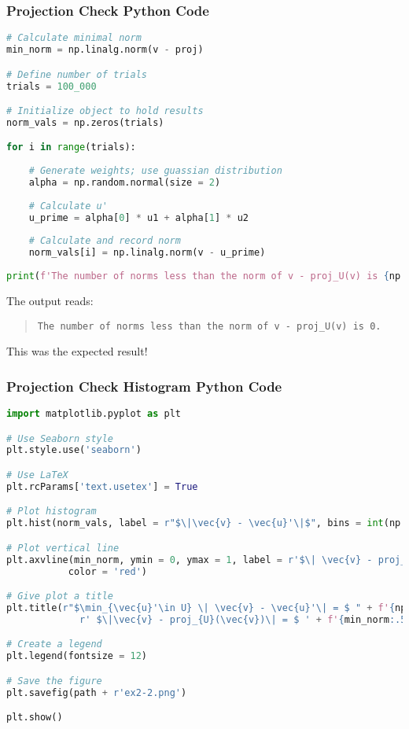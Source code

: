 \documentclass{beamer}
\begin{document}
\begin{frame}[fragile]
\frametitle{Projection Check Python Code}
\begin{lstlisting}[language=Python]
# Calculate minimal norm
min_norm = np.linalg.norm(v - proj)

# Define number of trials
trials = 100_000

# Initialize object to hold results
norm_vals = np.zeros(trials)

for i in range(trials):
    
    # Generate weights; use guassian distribution
    alpha = np.random.normal(size = 2)
    
    # Calculate u'
    u_prime = alpha[0] * u1 + alpha[1] * u2
    
    # Calculate and record norm
    norm_vals[i] = np.linalg.norm(v - u_prime)
    
print(f'The number of norms less than the norm of v - proj_U(v) is {np.sum(norm_vals < min_norm)}.')
\end{lstlisting}
The output reads:
\begin{quote}
\small
\texttt{The number of norms less than the norm of v - proj\_U(v) is 0.}
\end{quote}
This was the expected result!
\end{frame}

\begin{frame}[fragile]
\frametitle{Projection Check Histogram Python Code}

\begin{lstlisting}[language=Python]
import matplotlib.pyplot as plt

# Use Seaborn style
plt.style.use('seaborn')

# Use LaTeX
plt.rcParams['text.usetex'] = True

# Plot histogram
plt.hist(norm_vals, label = r"$\|\vec{v} - \vec{u}'\|$", bins = int(np.sqrt(trials)))

# Plot vertical line
plt.axvline(min_norm, ymin = 0, ymax = 1, label = r'$\| \vec{v} - proj_U(\vec{v})\|$', 
           color = 'red')

# Give plot a title
plt.title(r"$\min_{\vec{u}'\in U} \| \vec{v} - \vec{u}'\| = $ " + f'{np.min(norm_vals):.5f};' +
             r' $\|\vec{v} - proj_{U}(\vec{v})\| = $ ' + f'{min_norm:.5f}.', fontsize = 15)

# Create a legend
plt.legend(fontsize = 12)

# Save the figure
plt.savefig(path + r'ex2-2.png')

plt.show()
\end{lstlisting}
\end{frame}
\end{document}
